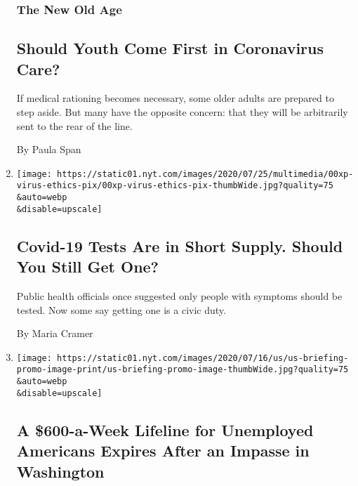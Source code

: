 \begin{enumerate}
{  \subsubsection{The New Old Age}\label{the-new-old-age}}

  \hypertarget{should-youth-come-first-in-coronavirus-care}{%
  \subsection{Should Youth Come First in Coronavirus
  Care?}\label{should-youth-come-first-in-coronavirus-care}}

  If medical rationing becomes necessary, some older adults are prepared
  to step aside. But many have the opposite concern: that they will be
  arbitrarily sent to the rear of the line.

  By Paula Span
\item
  \href{/2020/07/31/health/coronavirus-covid-testing.html}{}

  \texttt{[image: https://static01.nyt.com/images/2020/07/25/multimedia/00xp-virus-ethics-pix/00xp-virus-ethics-pix-thumbWide.jpg?quality=75\\\&auto=webp\\\&disable=upscale]}

  \hypertarget{covid-19-tests-are-in-short-supply-should-you-still-get-one}{%
  \subsection{Covid-19 Tests Are in Short Supply. Should You Still Get
  One?}\label{covid-19-tests-are-in-short-supply-should-you-still-get-one}}

  Public health officials once suggested only people with symptoms
  should be tested. Now some say getting one is a civic duty.

  By Maria Cramer
\item
  \href{/2020/07/31/world/coronavirus-covid-19.html}{}

  \texttt{[image: https://static01.nyt.com/images/2020/07/16/us/us-briefing-promo-image-print/us-briefing-promo-image-thumbWide.jpg?quality=75\\\&auto=webp\\\&disable=upscale]}

  \hypertarget{a-600-a-week-lifeline-for-unemployed-americans-expires-after-an-impasse-in-washington}{%
  \subsection{A \$600-a-Week Lifeline for Unemployed Americans Expires
  After an Impasse in
  Washington}\label{a-600-a-week-lifeline-for-unemployed-americans-expires-after-an-impasse-in-washington}}


\end{enumerate}
